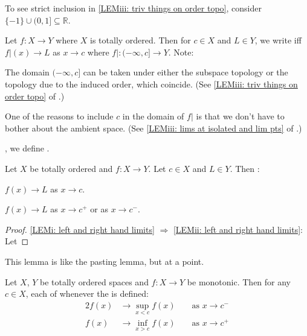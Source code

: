 	\begin{rmk}
		To see strict inclusion in \ref{LEMiii: triv things on order topo}, consider $\{-1\}\cup(0, 1]\subseteq \mathbb R$.
	\end{rmk}
	
	Let $f\colon X\to Y$ where $X$ is totally ordered. Then for $c\in X$ and $L\in Y$, we write  iff $f|(x)\to L$ as $x\to c$ where $f|\colon (-\infty, c]\to Y$. Note:
	\begin{mylist}
		\item The domain $(-\infty, c]$ can be taken under either the subspace topology or the topology due to the induced order, which coincide. (See \ref{LEMiii: triv things on order topo} of .)
		
		\item One of the reasons to include $c$ in the domain of $f|$ is that we don't have to bother about the ambient space. (See \ref{LEMiii: lims at isolated and lim pts} of .)
	\end{mylist}
	
	\Lly, we define \defn{$f(x)\to L$ as $x\to c^+$}.
	
	
	\begin{lem}\label{LEM: limits via the left and right hand limits}
		Let $X$ be totally ordered and $f\colon X\to Y$. Let $c\in X$ and $L\in Y$. Then \tfae:
		\begin{mylist}
			\item\label{LEMi: left and right hand limits} $f(x)\to L$ as $x\to c$.
			
			\item\label{LEMii: left and right hand limits} $f(x)\to L$ as $x\to c^+$ or as $x\to c^-$.
		\end{mylist}
	\end{lem}
	
	\begin{proof}
		\ref{LEMi: left and right hand limits} $\Rightarrow$ \ref{LEMii: left and right hand limits}:
		Let 
	\end{proof}
	
	\begin{rmk}
		This lemma is like the pasting lemma, but at a point.
	\end{rmk}
	
	
	\begin{prp}\label{PRP: one-sided lims of monotonics}
		Let $X$, $Y$ be totally ordered spaces and $f\colon X\to Y$ be monotonic. Then for any $c\in X$, each of  whenever the \RHS is defined:
		\begin{alignat*}{2}
			f(x)& \to \sup_{x < c}f(x) &&\text{ as } x\to c^-\\
			f(x)& \to \inf_{x > c}f(x) &&\text{ as } x\to c^+
		\end{alignat*}
	\end{prp}
	
